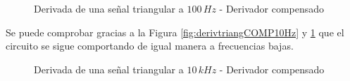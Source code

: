\documentclass[11pt, a4paper]{article}
\begin{document}
\begin{figure}[H]
	\begin{center}
		\caption{Derivada de una señal triangular a $100 \,Hz$ - Derivador compensado}
		\label{fig:derivtriangCOMP100Hz}
	\end{center}
\end{figure}

Se puede comprobar gracias a la Figura \ref{fig:derivtriangCOMP10Hz} y \ref{fig:derivtriangCOMP100Hz} que el circuito se sigue comportando de igual manera a frecuencias bajas.

\begin{figure}[H]
	\begin{center}
		\caption{Derivada de una señal triangular a $10 \,kHz$ - Derivador compensado}
		\label{fig:derivtriangCOMP10kHz}
	\end{center}
\end{figure}
\end{document}
